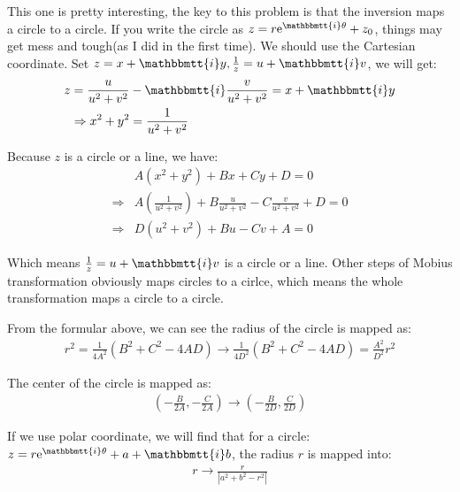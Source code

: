 \documentclass[]{ctexart}
\newcommand{\mi}{\mathbbmtt{i}}
\newcommand{\me}{\mathrm{e}}
\begin{document}
		This one is pretty interesting, the key to this problem is that the inversion maps a circle to a circle. If you write the circle as $z=r\me^{\mi \theta}+z_0$, things may get mess and tough(as I did in the first time). We should use the Cartesian coordinate. Set $z=x+\mi y, \frac{1}{z}=u+\mi v$, we will get:
			\begin{equation*}
			\begin{aligned}
				z=\frac{u}{u^2+v^2}&-\mi \frac{v}{u^2+v^2}=x+\mi y\\
				\Rightarrow x^2+y^2&=\frac{1}{u^2+v^2}
			\end{aligned}
			\end{equation*}
			
		Because $z$ is a circle or a line, we have:
			\begin{equation*}
			\begin{aligned}
				&A(x^2+y^2)+Bx+Cy+D=0\\
				\Rightarrow &A(\frac{1}{u^2+v^2})+B\frac{u}{u^2+v^2}-C\frac{v}{u^2+v^2}+D=0\\
				\Rightarrow &D(u^2+v^2)+Bu-Cv+A=0
			\end{aligned}
			\end{equation*}
			
		Which means $\frac{1}{z}=u+\mi v$ is a circle or a line. Other steps of Mobius transformation obviously maps circles to a cirlce, which means the whole transformation maps a circle to a circle. 
		
		From the formular above, we can see the radius of the circle is mapped as:
			\begin{equation*}
			\begin{aligned}
				r^2=\frac{1}{4A^2}\left(B^2+C^2-4AD\right)\rightarrow \frac{1}{4D^2}\left(B^2+C^2-4AD\right)=\frac{A^2}{D^2}r^2
			\end{aligned}
			\end{equation*}
			
		The center of the circle is mapped as:
			\begin{equation*}
			\begin{aligned}
				\left(-\frac{B}{2A},-\frac{C}{2A}\right)\rightarrow\left(-\frac{B}{2D},\frac{C}{2D}\right)
			\end{aligned}
			\end{equation*}
		
		If we use polar coordinate, we will find that for a circle:$z=r\me^{\mi \theta}+a+\mi b$, the radius $r$ is mapped into:
			\begin{equation*}
			\begin{aligned}
				r\rightarrow \frac{r}{|a^2+b^2-r^2|}
			\end{aligned}
			\end{equation*}
			
\end{document}
